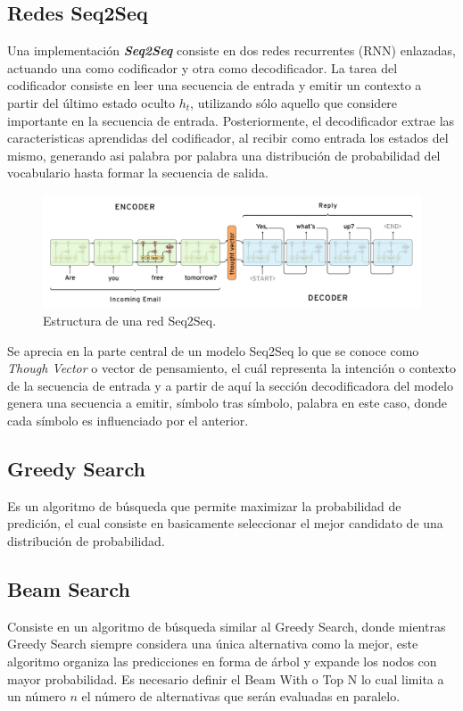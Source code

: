 \documentclass[12pt, letterpaper]{article}
\begin{document}
    \subsection{Redes Seq2Seq}
    Una implementación \textit{\textbf{Seq2Seq}} consiste en dos redes recurrentes (RNN) enlazadas, actuando una como codificador y otra como decodificador. La tarea del codificador consiste en leer una secuencia de entrada y emitir un contexto a partir del último estado oculto $h_t$, utilizando sólo aquello que considere importante en la secuencia de entrada. Posteriormente, el decodificador extrae las caracteristicas aprendidas del codificador, al recibir como entrada los estados del mismo, generando asi palabra por palabra una distribución de probabilidad del vocabulario hasta formar la secuencia de salida\cite{Ramamoorthy}\cite{Ramamoorthy2}.

    \begin{figure}[H]
        \centering
        \includegraphics[width=\linewidth]{img/Seq2Seq.png}
        \caption{Estructura de una red Seq2Seq.}
    \end{figure}

    Se aprecia en la parte central de un modelo Seq2Seq lo que se conoce como \emph{Though Vector} o vector de pensamiento, el cuál representa la intención o contexto de la secuencia de entrada y a partir de aquí la sección decodificadora del modelo genera una secuencia a emitir, símbolo tras símbolo, palabra en este caso, donde cada símbolo es influenciado por el anterior.
        
    \subsection{Greedy Search}
    Es un algoritmo de búsqueda que permite maximizar la probabilidad de predición, el cual consiste en basicamente seleccionar el mejor candidato de una distribución de probabilidad\cite{BibEntry2020Jun}.
    
    \subsection{Beam Search}
    Consiste en un algoritmo de búsqueda similar al Greedy Search, donde mientras Greedy Search siempre considera una única alternativa como la mejor, este algoritmo organiza las predicciones en forma de árbol y expande los nodos con mayor probabilidad.  Es necesario definir el Beam With o Top N lo cual limita a un número $n$ el número de alternativas que serán evaluadas en paralelo\cite{Khandelwal_2020}.
        
\end{document}

